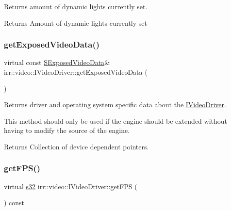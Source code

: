 Returns amount of dynamic lights currently set. 

\begin{DoxyReturn}{Returns}
Amount of dynamic lights currently set 
\end{DoxyReturn}
\mbox{\label{classirr_1_1video_1_1IVideoDriver_a4f3535b2125e654e2e9645745e50cc49}} 
\subsubsection{\texorpdfstring{get\+Exposed\+Video\+Data()}{getExposedVideoData()}}
{\footnotesize\ttfamily virtual const \hyperlink{structirr_1_1video_1_1SExposedVideoData}{S\+Exposed\+Video\+Data}\& irr\+::video\+::\+I\+Video\+Driver\+::get\+Exposed\+Video\+Data (\begin{DoxyParamCaption}{ }\end{DoxyParamCaption})\hspace{0.3cm}{\ttfamily [pure virtual]}}



Returns driver and operating system specific data about the \hyperlink{classirr_1_1video_1_1IVideoDriver}{I\+Video\+Driver}. 

This method should only be used if the engine should be extended without having to modify the source of the engine. \begin{DoxyReturn}{Returns}
Collection of device dependent pointers. 
\end{DoxyReturn}
\mbox{\label{classirr_1_1video_1_1IVideoDriver_a5b71428402c0b6a3b18b8f2fa408af13}} 
\subsubsection{\texorpdfstring{get\+F\+P\+S()}{getFPS()}}
{\footnotesize\ttfamily virtual \hyperlink{namespaceirr_ac66849b7a6ed16e30ebede579f9b47c6}{s32} irr\+::video\+::\+I\+Video\+Driver\+::get\+F\+PS (\begin{DoxyParamCaption}{ }\end{DoxyParamCaption}) const\hspace{0.3cm}{\ttfamily [pure virtual]}}



